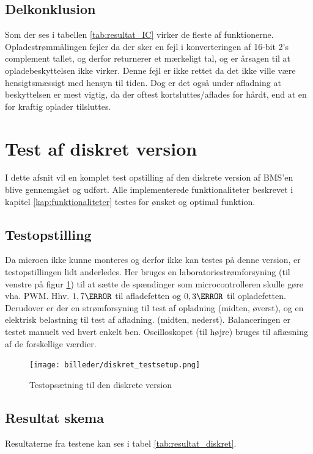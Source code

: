 \subsection{Delkonklusion}
Som der ses i tabellen \ref{tab:resultat_IC} virker de fleste af funktionerne. Opladestrømmålingen fejler da der sker en fejl i konverteringen af 16-bit 2's complement tallet, og derfor returnerer et mærkeligt tal, og er årsagen til at opladebeskyttelsen ikke virker. Denne fejl er ikke rettet da det ikke ville være hensigtsmæssigt med hensyn til tiden. Dog er det også under afladning at beskyttelsen er mest vigtig, da der oftest kortsluttes/aflades for hårdt, end at en for kraftig oplader tilsluttes.

\section{Test af diskret version}\label{afs:test_diskret}
I dette afsnit vil en komplet test opstilling af den diskrete version af BMS'en blive gennemgået og udført. Alle implementerede funktionaliteter beskrevet i kapitel \ref{kap:funktionaliteter} testes for ønsket og optimal funktion. 

\subsection{Testopstilling}
Da microen ikke kunne monteres og derfor ikke kan testes på denne version, er testopstillingen lidt anderledes. Her bruges en laboratoriestrømforsyning (til venstre på figur \ref{fig:diskret_testsetup}) til at sætte de spændinger som microcontrolleren skulle gøre vha. PWM. Hhv. $1,7\volt$ til afladefetten og $0,3\volt$ til opladefetten. Derudover er der en strømforsyning til test af opladning (midten, øverst), og en elektrisk belastning til test af afladning. (midten, nederst). Balanceringen er testet manuelt ved hvert enkelt ben. Oscilloskopet (til højre) bruges til aflæsning af de forskellige værdier. 

\begin{figure}[h]
	\centering
	\texttt{[image: billeder/diskret\_testsetup.png]}
	\caption{Testopsætning til den diskrete version}
	\label{fig:diskret_testsetup}
\end{figure}

\subsection{Resultat skema}
Resultaterne fra testene kan ses i tabel \ref{tab:resultat_diskret}.


